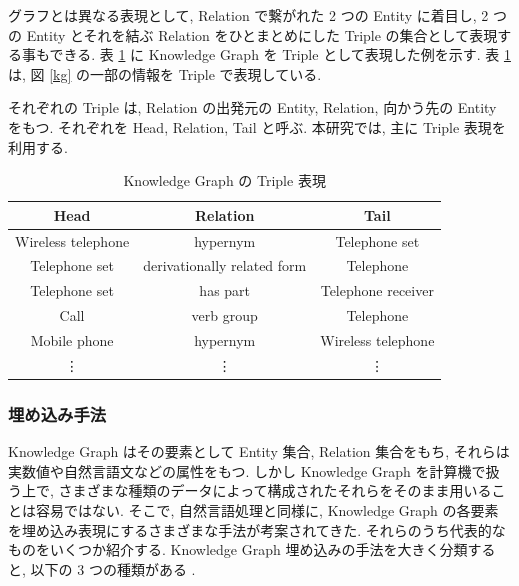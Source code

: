 グラフとは異なる表現として, Relation で繋がれた 2 つの Entity に着目し, 2 つの Entity とそれを結ぶ Relation をひとまとめにした Triple の集合として表現する事もできる. 表 \ref{Triple} に Knowledge Graph を Triple として表現した例を示す. 表 \ref{Triple} は, 図 \ref{kg} の一部の情報を Triple で表現している. \par
それぞれの Triple は, Relation の出発元の Entity, Relation, 向かう先の Entity をもつ. それぞれを Head, Relation, Tail と呼ぶ. 本研究では, 主に Triple 表現を利用する. \par

\begin{table}[h]
    \centering
    \caption{Knowledge Graph の Triple 表現}
    \label{Triple}
    \begin{tabular}{|c|c|c|} \hline
      Head & Relation & Tail \\ \hline \hline
      Wireless telephone & hypernym & Telephone set \\ \hline
      Telephone set & derivationally related form & Telephone \\ \hline
      Telephone set& has part & Telephone receiver \\ \hline
      Call & verb group & Telephone \\ \hline
      Mobile phone & hypernym & Wireless telephone \\ \hline
      \vdots & \vdots & \vdots \\ \hline
    \end{tabular}
\end{table}

\subsubsection{埋め込み手法}

Knowledge Graph はその要素として Entity 集合, Relation 集合をもち, それらは実数値や自然言語文などの属性をもつ. しかし Knowledge Graph を計算機で扱う上で, さまざまな種類のデータによって構成されたそれらをそのまま用いることは容易ではない. そこで, 自然言語処理と同様に, Knowledge Graph の各要素を埋め込み表現にするさまざまな手法が考案されてきた. それらのうち代表的なものをいくつか紹介する. Knowledge Graph 埋め込みの手法を大きく分類すると, 以下の 3 つの種類がある \cite{Embedding}. \par

